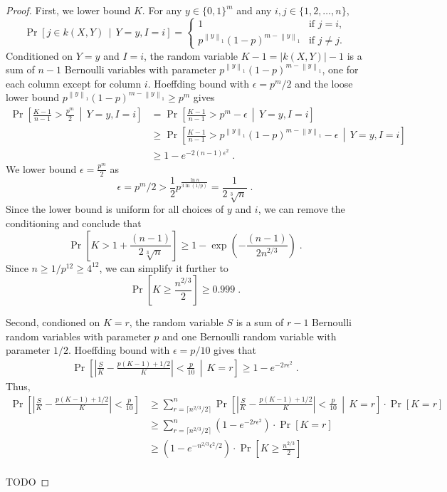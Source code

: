 \documentclass[10pt]{article}
\newcommand{\norm}[1]{\left\| #1 \right\|}
\begin{document}
\begin{proof}
First, we lower bound $K$. For any $y \in \{0,1\}^m$ and any $i,j \in \{1,2,\dots,n\}$,
$$
\Pr \left[ j \in k(X,Y)  \, \middle| \, Y = y, I = i \right]
=
\begin{cases}
1 & \text{if $j = i$,} \\
p^{\norm{y}_1} (1 - p)^{m - \norm{y}_1} & \text{if $j \neq j$.}
\end{cases}
$$
Conditioned on $Y = y$ and $I=i$, the random variable $K - 1 = |k(X,Y)| - 1$ is
a sum of $n-1$ Bernoulli variables with parameter $p^{\norm{y}_1} (1 - p)^{m - \norm{y}_1}$, one for each column except for column $i$.
Hoeffding bound with $\epsilon = p^m/2$ and the loose lower bound $p^{\norm{y}_1} (1 - p)^{m - \norm{y}_1} \ge p^m$ gives
\begin{align*}
\Pr \left[ \frac{K - 1}{n - 1} > \frac{p^m}{2}  \, \middle| \,  Y = y, I = i  \right]
& = \Pr \left[ \frac{K - 1}{n - 1} > p^m - \epsilon  \, \middle| \,  Y = y, I = i  \right] \\
& \ge \Pr \left[ \frac{K - 1}{n - 1} > p^{\norm{y}_1} (1 - p)^{m - \norm{y}_1} - \epsilon  \, \middle| \,  Y = y, I = i  \right] \\
& \ge 1 - e^{-2(n-1) \epsilon^2} \; .
\end{align*}
We lower bound $\epsilon = \frac{p^m}{2}$ as
$$
\epsilon = p^m/2 > \frac{1}{2} p^\frac{\ln n}{3 \ln(1/p)} = \frac{1}{2\sqrt[3]{n}} \; .
$$
Since the lower bound is uniform for all choices of $y$ and $i$, we can remove
the conditioning and conclude that
$$
\Pr \left[ K > 1 + \frac{(n-1)}{2\sqrt[3]{n}} \right] \ge 1 - \exp \left(- \frac{(n-1)}{2 n^{2/3}} \right) \; .
$$
Since $n \ge 1/p^{12} \ge 4^{12}$, we can simplify it further to
$$
\Pr \left[ K \ge \frac{n^{2/3}}{2} \right] \ge 0.999 \; .
$$

Second, condioned on $K=r$, the random variable $S$
is a sum of $r-1$ Bernoulli random variables with parameter $p$
and one Bernoulli random variable with parameter $1/2$. Hoeffding bound with $\epsilon = p/10$
gives that
\begin{align*}
\Pr \left[ \left| \frac{S}{K} - \frac{p(K - 1) + 1/2}{K} \right| < \frac{p}{10}  \, \middle| \, K = r \right] \ge 1 - e^{-2 r \epsilon^2} \; .
\end{align*}
Thus,
\begin{align*}
\Pr \left[ \left| \frac{S}{K} - \frac{p(K - 1) + 1/2}{K} \right| < \frac{p}{10} \right]
& \ge \sum_{r = \lceil n^{2/3} / 2 \rceil}^n \Pr \left[ \left| \frac{S}{K} - \frac{p(K - 1) + 1/2}{K} \right| < \frac{p}{10}  \, \middle| \,  K = r \right] \cdot \Pr[K = r] \\
& \ge \sum_{r = \lceil n^{2/3} / 2 \rceil}^n \left( 1 - e^{-2 r \epsilon^2} \right) \cdot \Pr[K = r] \\
& \ge \left( 1 - e^{-n^{2/3}  \epsilon^2 / 2} \right) \cdot \Pr \left[ K \ge \frac{n^{2/3}}{2} \right] \\
\end{align*}

TODO

\end{proof}
\end{document}

